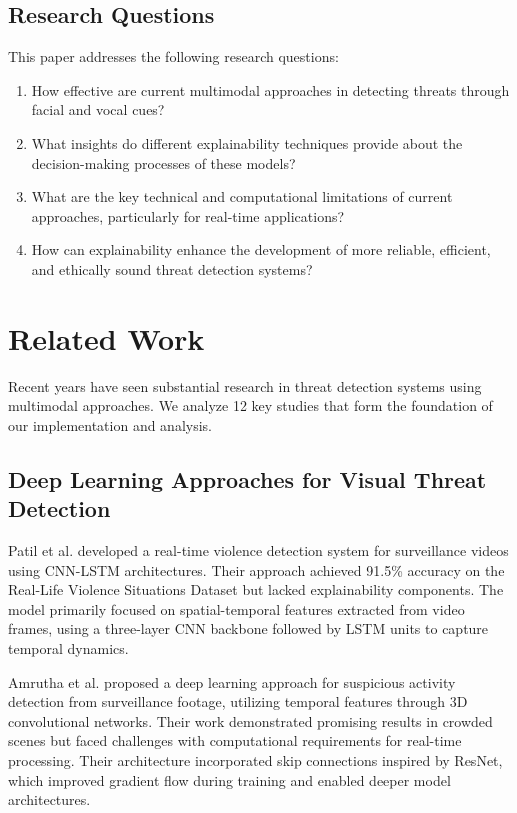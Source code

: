 \documentclass[conference,compsoc]{IEEEtran}
\begin{document}
\subsection{Research Questions}
This paper addresses the following research questions:
\begin{enumerate}
    \item How effective are current multimodal approaches in detecting threats through facial and vocal cues?
    \item What insights do different explainability techniques provide about the decision-making processes of these models?
    \item What are the key technical and computational limitations of current approaches, particularly for real-time applications?
    \item How can explainability enhance the development of more reliable, efficient, and ethically sound threat detection systems?
\end{enumerate}

\section{Related Work}
Recent years have seen substantial research in threat detection systems using multimodal approaches. We analyze 12 key studies that form the foundation of our implementation and analysis.

\subsection{Deep Learning Approaches for Visual Threat Detection}
Patil et al. \cite{patil2023} developed a real-time violence detection system for surveillance videos using CNN-LSTM architectures. Their approach achieved 91.5\% accuracy on the Real-Life Violence Situations Dataset but lacked explainability components. The model primarily focused on spatial-temporal features extracted from video frames, using a three-layer CNN backbone followed by LSTM units to capture temporal dynamics.

Amrutha et al. \cite{amrutha2020} proposed a deep learning approach for suspicious activity detection from surveillance footage, utilizing temporal features through 3D convolutional networks. Their work demonstrated promising results in crowded scenes but faced challenges with computational requirements for real-time processing. Their architecture incorporated skip connections inspired by ResNet, which improved gradient flow during training and enabled deeper model architectures.
\end{document}
